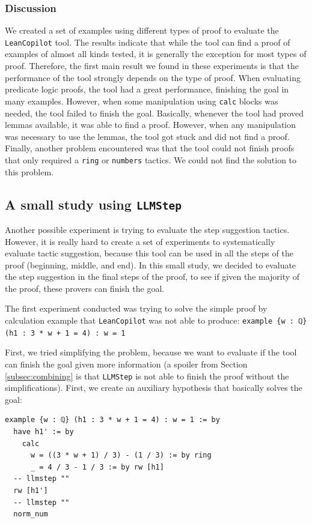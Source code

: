 \documentclass[12pt]{article}
\newcommand{\leancopilot}{\texttt{LeanCopilot} }
\newcommand{\llmstep}{\texttt{LLMStep} }
\begin{document}
\subsubsection{Discussion}
We created a set of examples using different types of proof to evaluate the \leancopilot tool. The results indicate that while the tool can find a proof of examples of almost all kinds tested, it is generally the exception for most types of proof. Therefore, the first main result we found in these experiments is that the performance of the tool strongly depends on the type of proof. When evaluating predicate logic proofs, the tool had a great performance, finishing the goal in many examples. However, when some manipulation using \texttt{calc} blocks was needed, the tool failed to finish the goal. Basically, whenever the tool had proved lemmas available, it was able to find a proof. However, when any manipulation was necessary to use the lemmas, the tool got stuck and did not find a proof. Finally, another problem encountered was that the tool could not finish proofs that only required a \texttt{ring} or \texttt{numbers} tactics. We could not find the solution to this problem. 

\subsection{A small study using \llmstep}
Another possible experiment is trying to evaluate the step suggestion tactics. However, it is really hard to create a set of experiments to  systematically evaluate tactic suggestion, because this tool can be used in all the steps of the proof (beginning, middle, and end). In this small study, we decided to evaluate the step suggestion in the final steps of the proof, to see if given the majority of the proof, these provers can finish the goal.

The first experiment conducted was trying to solve the simple proof by calculation example that \leancopilot was not able to produce: \lstinline|example {w : ℚ} (h1 : 3 * w + 1 = 4) : w = 1|

First, we tried simplifying the problem, because we want to evaluate if the tool can finish the goal given more information (a spoiler from Section \ref{subsec:combining} is that \llmstep is not able to finish the proof without the simplifications). First, we create an auxiliary hypothesis that basically solves the goal:

\begin{lstlisting}[title=\llmstep Proof]
example {w : ℚ} (h1 : 3 * w + 1 = 4) : w = 1 := by
  have h1' := by
    calc
      w = ((3 * w + 1) / 3) - (1 / 3) := by ring
      _ = 4 / 3 - 1 / 3 := by rw [h1]
  -- llmstep ""
  rw [h1']
  -- llmstep ""
  norm_num
\end{lstlisting}
\end{document}

